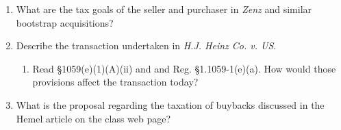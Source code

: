 \documentclass[12pt]{article}
\begin{document}
\begin{enumerate}
	Assume that mutual fund has 10 unrelated shareholders (A through J) each owning 10 shares (a total of 100 shares outstanding), and each share is worth \$10.  Assume that each shareholder has a basis of \$1 in each share.  What are the tax consequences to A in the following alternatives? 
		\begin{enumerate}
		\item A redeems all of its shares for \$100.
		\item A redeems one of its shares for \$10.
		\item A redeems one of its shares for \$10, and simultaneously B and C redeem all of their shares for \$100 each.  Please answer the question before looking at \S302(b)(5).
		\end{enumerate}	
	\item	
		What are the tax goals of the seller and purchaser in \emph{Zenz} and similar bootstrap acquisitions?
		
	\item Describe the transaction undertaken in \emph{H.J. Heinz Co. v. US}.  
		\begin{enumerate}
		\item Read \S1059(e)(1)(A)(ii) and and Reg. \S1.1059-1(e)(a).   How would those provisions affect the transaction today?
		\end{enumerate}
		
	\item	
		What is the proposal regarding the taxation of buybacks discussed in the Hemel article on the class web page?
	\end{enumerate}
	
	






	
\end{document}
